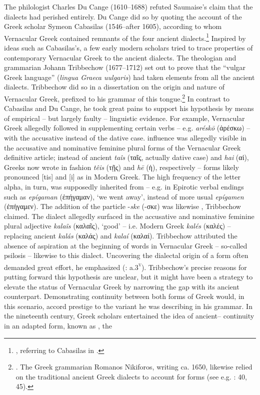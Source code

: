 The  philologist Charles Du Cange (1610–1688) refuted Saumaise’s claim that the dialects had perished entirely. Du Cange did so by quoting the account of the Greek scholar Symeon Cabasilas (1546–after 1605), according to whom Vernacular Greek contained remnants of the four ancient dialects.\footnote{ \citet[viii]{Du1688}, referring to Cabasilas in \citet[462]{Crusius1584}.} Inspired by ideas such as Cabasilas’s, a few early modern scholars tried to trace properties of contemporary Vernacular Greek to the ancient dialects. The  theologian and grammarian Johann Tribbechow (1677–1712) set out to prove that the “vulgar Greek language” (\textit{lingua Graeca uulgaris}) had taken elements from all the ancient dialects. Tribbechow did so in a dissertation on the origin and nature of Vernacular Greek, prefixed to his grammar of this tongue.\footnote{\citet[a.3\textsc{\textsuperscript{r}}]{Tribbechow1705}. The Greek grammarian Romanos Nikiforos, writing ca. 1650, likewise relied on the traditional ancient Greek dialects to account for  forms (see e.g. \citealt{Nikiforos1908}: 40, 45).} In contrast to Cabasilas and Du Cange, he took great pains to support his hypothesis by means of empirical – but largely faulty – linguistic evidence. For example, Vernacular Greek allegedly followed  in supplementing certain verbs – e.g. \textit{aréskō} (ἀρέσκω) – with the accusative instead of the dative case.  influence was allegedly visible in the accusative and nominative feminine plural forms of the Vernacular Greek definitive article; instead of ancient \textit{taîs} (ταῖς, actually dative case) and \textit{hai} (αἱ), Greeks now wrote in  fashion \textit{têis} (τῇς) and \textit{hē} (ἡ), respectively – forms likely pronounced [tis] and [i] as in Modern Greek. The high frequency of the letter alpha, in turn, was supposedly inherited from  – e.g. in  Epirotic verbal endings such as \textit{epígaman} (ἐπήγαμαν), ‘we went away’, instead of more usual \textit{epígamen} (ἐπήγαμεν). The addition of the particle -\textit{ske} (-σκε) was likewise , Tribbechow claimed. The  dialect allegedly surfaced in the accusative and nominative feminine plural adjective \textit{kalaîs} (καλαῖς), ‘good’ – i.e. Modern Greek \textit{kalés} (καλές) – replacing ancient \textit{kalás} (καλάς) and \textit{kalaí} (καλαί). Tribbechow attributed the absence of aspiration at the beginning of words in Vernacular Greek – so-called psilosis – likewise to this dialect. Uncovering the dialectal origin of a  form often demanded great effort, he emphasized (\citealt{Tribbechow1705}: a.3\textsc{\textsuperscript{v}}). Tribbechow’s precise reasons for putting forward this hypothesis are unclear, but it might have been a strategy to elevate the status of Vernacular Greek by narrowing the gap with its ancient counterpart. Demonstrating continuity between both forms of Greek would, in this scenario, accord prestige to the  variant he was describing in his grammar. In the nineteenth century, Greek scholars entertained the idea of ancient– continuity in an adapted form, known as , the 
